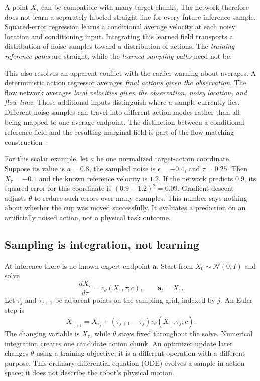 A point $X_\tau$ can be compatible with many target chunks. The network therefore does not learn a separately labeled straight line for every future inference sample. Squared-error regression learns a conditional average velocity at each noisy location and conditioning input. Integrating this learned field transports a distribution of noise samples toward a distribution of actions. The \emph{training reference paths} are straight, while the \emph{learned sampling paths} need not be.

This also resolves an apparent conflict with the earlier warning about averages. A deterministic action regressor averages \emph{final actions given the observation}. The flow network averages \emph{local velocities given the observation, noisy location, and flow time}. Those additional inputs distinguish where a sample currently lies. Different noise samples can travel into different action modes rather than all being mapped to one average endpoint. The distinction between a conditional reference field and the resulting marginal field is part of the flow-matching construction~\citep{floworiginal,flowguide}.

For this scalar example, let $a$ be one normalized target-action coordinate. Suppose its value is $a=0.8$, the sampled noise is $\epsilon=-0.4$, and $\tau=0.25$. Then $X_\tau=-0.1$ and the known reference velocity is $1.2$. If the network predicts $0.9$, its squared error for this coordinate is $(0.9-1.2)^2=0.09$. Gradient descent adjusts $\theta$ to reduce such errors over many examples. This number says nothing about whether the cup was moved successfully. It evaluates a prediction on an artificially noised action, not a physical task outcome.

\subsection{Sampling is integration, not learning}
At inference there is no known expert endpoint $\mathbf a$. Start from $X_0\sim\mathcal N(0,I)$ and solve
\begin{equation}
 \frac{dX_\tau}{d\tau}=v_\theta(X_\tau,\tau;c),
 \qquad \mathbf a_t=X_1.
 \label{eq:ode}
\end{equation}
Let $\tau_j$ and $\tau_{j+1}$ be adjacent points on the sampling grid, indexed by $j$. An Euler step is
\begin{equation}
 X_{\tau_{j+1}}=X_{\tau_j}+
 (\tau_{j+1}-\tau_j)v_\theta(X_{\tau_j},\tau_j;c).
 \label{eq:euler}
\end{equation}
The changing variable is $X_\tau$, while $\theta$ stays fixed throughout the solve. Numerical integration creates one candidate action chunk. An optimizer update later changes $\theta$ using a training objective; it is a different operation with a different purpose. This ordinary differential equation (ODE) evolves a sample in action space; it does not describe the robot's physical motion.

